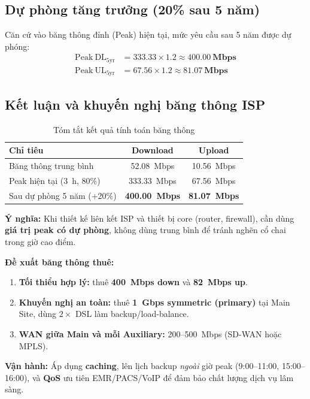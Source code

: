 \subsection{Dự phòng tăng trưởng (20\% sau 5 năm)}
Căn cứ vào băng thông đỉnh (Peak) hiện tại, mức yêu cầu sau 5 năm được dự phóng:
\vspace{-0.4cm}
\begin{align*}
  \mathrm{Peak\ DL_{5yr}} &= 333.33 \times 1.2 \approx \mathbf{400.00\ \text{Mbps}} \\
  \mathrm{Peak\ UL_{5yr}} &= 67.56 \times 1.2 \approx \mathbf{81.07\ \text{Mbps}}
\end{align*}

\subsection{Kết luận và khuyến nghị băng thông ISP}

{
    \small
    \renewcommand{\arraystretch}{1.3}
    \begin{longtable}{lcc}
        \caption{Tóm tắt kết quả tính toán băng thông} \\
        \toprule
        \textbf{Chỉ tiêu} & \textbf{Download} & \textbf{Upload} \\
        \midrule
        \endfirsthead
        
        \endhead

        \endfoot

        \bottomrule
        \endlastfoot

        Băng thông trung bình        & 52.08~Mbps           & 10.56~Mbps \\
        Peak hiện tại (3~h, 80\%)   & 333.33~Mbps          & 67.56~Mbps \\
        Sau dự phòng 5 năm (+20\%)  & \textbf{400.00~Mbps} & \textbf{81.07~Mbps} \\
    \end{longtable}
}

\vspace{0.2cm}
\noindent \textbf{Ý nghĩa:} Khi thiết kế liên kết ISP và thiết bị core (router, firewall), cần dùng \textbf{giá trị peak có dự phòng}, không dùng trung bình để tránh nghẽn cổ chai trong giờ cao điểm.

\vspace{0.4cm}
\noindent \textbf{Đề xuất băng thông thuê:}
\begin{enumerate}[leftmargin=*, label=\textbf{\arabic*.}]
  \item \textbf{Tối thiểu hợp lý:} thuê \textbf{400~Mbps down} và \textbf{82~Mbps up}.
  \item \textbf{Khuyến nghị an toàn:} thuê \textbf{1~Gbps symmetric (primary)} tại Main Site, dùng $2\times$ DSL làm backup/load-balance.
  \item \textbf{WAN giữa Main và mỗi Auxiliary:} 200--500~Mbps (SD-WAN hoặc MPLS).
\end{enumerate}

\vspace{0.4cm}
\noindent \textbf{Vận hành:} Áp dụng \textbf{caching}, lên lịch backup \emph{ngoài} giờ peak (9:00--11:00, 15:00--16:00), và \textbf{QoS} ưu tiên EMR/PACS/VoIP để đảm bảo chất lượng dịch vụ lâm sàng.